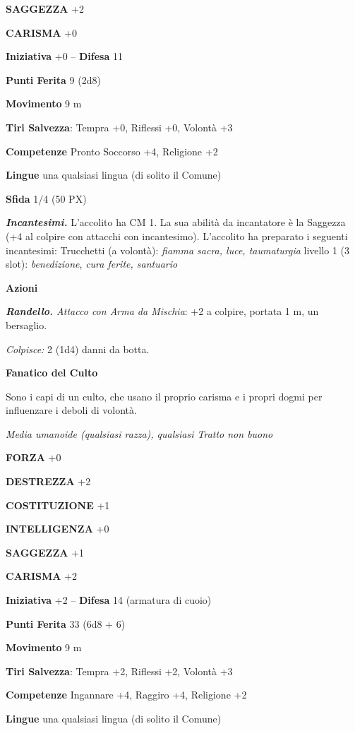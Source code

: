 \begin{multicols}{2}
\textbf{SAGGEZZA} +2

\textbf{CARISMA} +0

\textbf{Iniziativa} +0 -- \textbf{Difesa} 11

\textbf{Punti Ferita} 9 (2d8)

\textbf{Movimento} 9 m

\textbf{Tiri Salvezza}: Tempra +0, Riflessi +0, Volontà +3

\textbf{Competenze} Pronto Soccorso +4, Religione +2

\textbf{Lingue} una qualsiasi lingua (di solito il Comune)

\textbf{Sfida} 1/4 (50 PX)

\textit{\textbf{Incantesimi.}} L'accolito ha CM 1. La sua abilità da incantatore è la Saggezza (+4 al colpire con attacchi con incantesimo). L'accolito ha preparato i seguenti incantesimi: Trucchetti (a volontà): \textit{fiamma sacra, luce, taumaturgia} livello 1 (3 slot): \textit{benedizione}, \textit{cura ferite, santuario}

\medskip\textbf{Azioni}

\textit{\textbf{Randello.} Attacco con Arma da Mischia}: +2 a colpire, portata 1 m, un bersaglio.

\textit{Colpisce:} 2 (1d4) danni da botta.

\textbf{Fanatico del Culto}

Sono i capi di un culto, che usano il proprio carisma e i propri dogmi per influenzare i deboli di volontà.

\textit{Media umanoide (qualsiasi razza), qualsiasi Tratto non buono}

\textbf{FORZA} +0

\textbf{DESTREZZA} +2

\textbf{COSTITUZIONE} +1

\textbf{INTELLIGENZA} +0

\textbf{SAGGEZZA} +1

\textbf{CARISMA} +2

\textbf{Iniziativa} +2 -- \textbf{Difesa} 14 (armatura di cuoio)

\textbf{Punti Ferita} 33 (6d8 + 6)

\textbf{Movimento} 9 m

\textbf{Tiri Salvezza}: Tempra +2, Riflessi +2, Volontà +3

\textbf{Competenze} Ingannare +4, Raggiro +4, Religione +2

\textbf{Lingue} una qualsiasi lingua (di solito il Comune)


\end{multicols}
